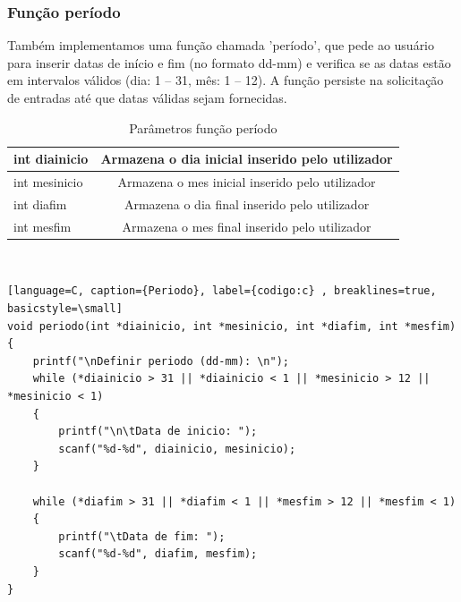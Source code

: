 \documentclass[a4wide]{report}
\begin{document}
\subsubsection{Função período }
Também implementamos uma função chamada 'período', que pede ao usuário para inserir datas de início e fim (no formato dd-mm) e verifica se as datas estão em intervalos válidos (dia: 1 – 31, mês: 1 – 12). A função persiste na solicitação de entradas até que datas válidas sejam fornecidas.
\begin{table}[h]
    \centering
    \caption{Parâmetros função período} 
    \begin{tabular}{|l|c|} \hline  
         int diainicio& Armazena o dia inicial inserido pelo utilizador \\ \hline  
         int mesinicio& Armazena o mes inicial inserido pelo utilizador \\ \hline  
         int diafim& Armazena o dia final inserido pelo utilizador\\ \hline  
         int mesfim& Armazena o mes final inserido pelo utilizador\\ \hline 
    \end{tabular}
\end{table}
\\
\begin{lstlisting}[language=C, caption={Periodo}, label={codigo:c} , breaklines=true, basicstyle=\small]
void periodo(int *diainicio, int *mesinicio, int *diafim, int *mesfim)
{
    printf("\nDefinir periodo (dd-mm): \n");
    while (*diainicio > 31 || *diainicio < 1 || *mesinicio > 12 || *mesinicio < 1)
    {
        printf("\n\tData de inicio: ");
        scanf("%d-%d", diainicio, mesinicio);
    }

    while (*diafim > 31 || *diafim < 1 || *mesfim > 12 || *mesfim < 1)
    {
        printf("\tData de fim: ");
        scanf("%d-%d", diafim, mesfim);
    }
} 
\end{lstlisting}
\end{document}

